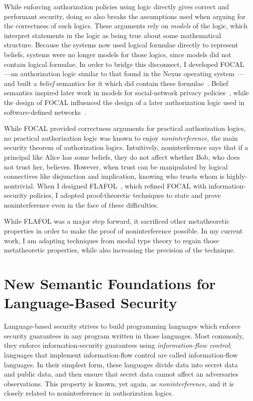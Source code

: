 \documentclass{article}
\theoremstyle{definition}
\begin{document}
While enforcing authorization policies using logic directly gives correct and performant security, doing so also breaks the assumptions used when arguing for the correctness of such logics.
These arguments rely on \emph{models} of the logic, which interpret statements in the logic as being true about some mathematical structure.
Because the systems now used logical formulae directly to represent beliefs, systems were no longer models for those logics, since models did not contain logical formulae.
In order to bridge this disconnect, I developed FOCAL---an authorization logic similar to that found in the Nexus operating system~\citep{SchneiderWS11,SirerDBRSWWS11}---and built a \emph{belief} semantics for it which did contain these formulae~\citep{HirschC13}.
Belief semantics inspired later work in models for social-network privacy policies~\cite{PardoS17}, while the design of FOCAL influenced the design of a later authorization logic used in software-defined networks~\citep{SkalkaRDKGDSF19}.

While FOCAL provided correctness arguments for practical authorization logics, no practical authorization logic was known to enjoy \emph{noninterference}, the main security theorem of authorization logics.
Intuitively, noninterference says that if a principal like Alice has some beliefs, they do not affect whether Bob, who does not trust her, believes.
However, when trust can be manipulated by logical connectives like disjunction and implication, knowing who trusts whom is highly-nontrivial.
When I designed FLAFOL~\citep{HirschACAT20}, which refined FOCAL with information-security policies, I adopted proof-theoretic techniques to state and prove noninterference even in the face of these difficulties.

While FLAFOL was a major step forward, it sacrificed other metatheoretic properties in order to make the proof of noninterference possible.
In my current work, I am adapting techniques from modal type theory to regain those metatheoretic properties, while also increasing the precision of the technique.

\section*{New Semantic Foundations for Language-Based Security}

Language-based security strives to build programming languages which enforce security guarantees in any program written in those languages.
Most commonly, they enforce information-security guarantees using \emph{information-flow control}; languages that implement information-flow control are called information-flow languages.
In their simplest form, these languages divide data into secret data and public data, and then ensure that secret data cannot affect an adversaries observations.
This property is known, yet again, as \emph{noninterference}, and it is closely related to noninterference in authorization logics.
\end{document}
